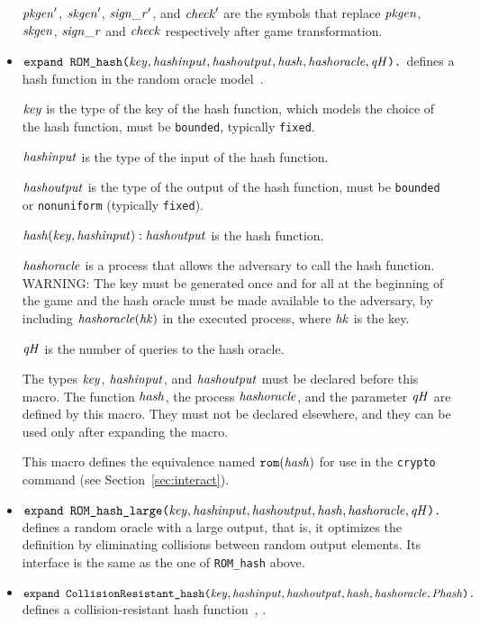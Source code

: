 \documentclass{article}
\begin{document}
\begin{itemize}
  $\mathit{pkgen}'$, $\mathit{skgen}'$, $\mathit{sign\_r}'$, and $\mathit{check}'$ are the symbols that replace $\mathit{pkgen}$, $\mathit{skgen}$, $\mathit{sign\_r}$ and $\mathit{check}$ respectively after game transformation.

\item $\texttt{expand ROM\_hash(}\mathit{key}, \mathit{hashinput}, \mathit{hashoutput}, \mathit{hash}, \mathit{hashoracle}, \mathit{qH}\texttt{).}$
defines a hash function in the random oracle model~\cite{Bellare93b}.

$\mathit{key}$ is the type of the key of the hash function, which models
the choice of the hash function, must be \texttt{bounded}, typically 
\texttt{fixed}.

   $\mathit{hashinput}$ is the type of the input of the hash function.

   $\mathit{hashoutput}$ is the type of the output of the hash function, must be \texttt{bounded} or \texttt{nonuniform} (typically \texttt{fixed}).

   $\mathit{hash}(\mathit{key}, \mathit{hashinput}): \mathit{hashoutput}$ is the hash function.

    $\mathit{hashoracle}$ is a process that allows the adversary to call the hash function.
    WARNING: The key must be generated once and for all at the beginning of the game 
   and the hash oracle must be made available to the adversary,
    by including $\mathit{hashoracle}(\mathit{hk})$ in the executed process,
    where $\mathit{hk}$ is the key.

    $\mathit{qH}$ is the number of queries to the hash oracle.

    The types $\mathit{key}$, $\mathit{hashinput}$, and $\mathit{hashoutput}$ must
    be declared before this macro.  The function $\mathit{hash}$, the
    process $\mathit{hashoracle}$, and the parameter $\mathit{qH}$ are defined
    by this macro. They must not be declared elsewhere, and they can
    be used only after expanding the macro.

   This macro defines the equivalence named $\texttt{rom}(\mathit{hash})$
   for use in the \texttt{crypto} command 
   (see Section~\ref{sec:interact}).

\item $\texttt{expand ROM\_hash\_large(}\mathit{key}, \mathit{hashinput}, \mathit{hashoutput}, \mathit{hash}, \mathit{hashoracle}, \mathit{qH}\texttt{).}$ defines a random oracle with a large output, that is, it optimizes the 
definition by eliminating collisions between random output elements.
Its interface is the same as the one of \texttt{ROM\_hash} above.

\item $\texttt{expand CollisionResistant\_hash(}\mathit{key}, \mathit{hashinput}, \mathit{hashoutput}, \mathit{hash}, \mathit{hashoracle}, \mathit{Phash}\texttt{).}$
defines a collision-resistant hash function~\cite{Rogaway04}, \cite[Section~8.2]{BellareCourse}.


\end{itemize}
\end{document}
